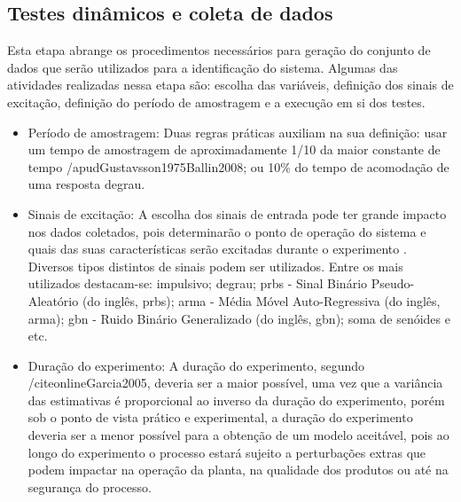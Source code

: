\subsection{Testes dinâmicos e coleta de dados}
\label{subsec:testes_dinamicos_e_coleta_de_dados}

Esta etapa abrange os procedimentos necessários para geração do conjunto de dados que serão utilizados
para a identificação do sistema. Algumas das atividades realizadas nessa etapa são: escolha das variáveis,
definição dos sinais de excitação, definição do período de amostragem e a execução em si dos testes.
\cite{Aguirre2015}

\begin{itemize}
    \item Período de amostragem: Duas regras práticas auxiliam na sua definição: usar um tempo
    de amostragem de aproximadamente 1/10 da maior constante de tempo /apud{Gustavsson1975}{Ballin2008}; ou
    10\% do tempo de acomodação de uma resposta degrau. \cite{Ballin2008}
    
    \item Sinais de excitação: A escolha dos sinais de entrada pode ter grande impacto nos dados coletados,
    pois determinarão o ponto de operação do sistema e quais das suas características serão excitadas
    durante o experimento \cite{Aguirre2015}.
    Diversos tipos distintos de sinais podem ser utilizados. Entre os mais utilizados destacam-se:
    impulsivo; degrau; \acrshort{prbs} - Sinal Binário Pseudo-Aleatório (do inglês, \acrlong{prbs});
    \acrshort{arma} - Média Móvel Auto-Regressiva (do inglês, \acrlong{arma});
    \acrshort{gbn} - Ruido Binário Generalizado (do inglês, \acrlong{gbn}); soma de senóides e etc. \cite{Aguirre2015}
    
    \item Duração do experimento: A duração do experimento, segundo /citeonline{Garcia2005}, deveria ser
        a maior possível, uma vez que a variância das estimativas é proporcional ao inverso da duração do
        experimento, porém sob o ponto de vista prático e experimental, a duração do experimento deveria ser
        a menor possível para a obtenção de um modelo aceitável, pois ao longo do experimento o processo
        estará sujeito a perturbações extras que podem impactar na operação da planta, na qualidade dos
        produtos ou até na segurança do processo.
\end{itemize}

